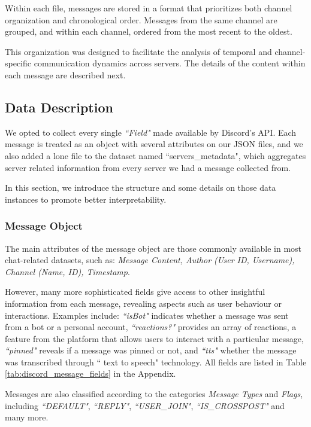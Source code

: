 Within each file, messages are stored in a format that prioritizes both channel organization and chronological order. Messages from the same channel are grouped, and within each channel, ordered from the most recent to the oldest.

This organization was designed to facilitate the analysis of temporal and channel-specific communication dynamics across servers. The details of the content within each message are described next.


\subsection{Data Description}

We opted to collect every single \textit{``Field"} made available by Discord's API. Each message is treated as an object with several attributes on our JSON files, and we also added a lone file to the dataset named ``servers\_metadata", which aggregates server related information from every server we had a message collected from. 

In this section, we introduce the structure and some details on those data instances to promote better interpretability.

\subsubsection{Message Object}

The main attributes of the message object are those commonly available in most chat-related datasets, such as: \textit{Message Content, Author (User ID, Username), Channel (Name, ID), Timestamp}.

However, many more sophisticated fields give access to other insightful information from each message, revealing aspects such as user behaviour or interactions. Examples include: \textit{``isBot"} indicates whether a message was sent from a bot or a personal account, \textit{``reactions?"} provides an array of reactions, a feature from the platform that allows users to interact with a particular message, \textit{``pinned"} reveals if a message was pinned or not, and \textit{``tts"} whether the message was transcribed through   `` text to speech" technology. All fields are listed in Table \ref{tab:discord_message_fields} in the Appendix. 

Messages are also classified according to the categories \textit{Message Types} and \textit{Flags}, including \textit{``DEFAULT"}, \textit{``REPLY"}, \textit{``USER\_JOIN"}, \textit{``IS\_CROSSPOST"} and many more. 


